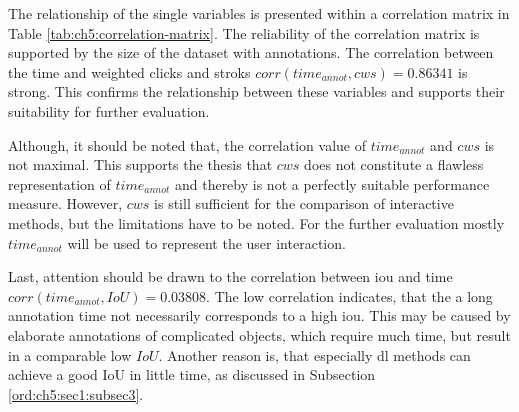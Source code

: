The relationship of the single variables is presented within a correlation matrix in Table \ref{tab:ch5:correlation-matrix}.
The reliability of the correlation matrix is supported by the size of the dataset with \getNumberBenchmarkAnnotations \space annotations.
The correlation between the time and weighted clicks and stroks $ corr \left(time_{annot}, cws \right) = 0.86341 $ is strong.
This confirms the relationship between these variables and supports their suitability for further evaluation.

Although, it should be noted that, the correlation value of $time_{annot}$ and $cws$ is not maximal.
This supports the thesis that $cws$ does not constitute a flawless representation of $time_{annot}$ and thereby is not a perfectly suitable performance measure.
However, $cws$ is still sufficient for the comparison of interactive methods, but the limitations have to be noted.
For the further evaluation mostly $time_{annot}$ will be used to represent the user interaction.

Last, attention should be drawn to the correlation between \gls{iou} and time $ corr \left(time_{annot}, IoU \right) = 0.03808 $.
The low correlation indicates, that the a long annotation time not necessarily corresponds to a high \gls{iou}.
This may be caused by elaborate annotations of complicated objects, which require much time, but result in a comparable low $ IoU $.
Another reason is, that especially \gls{dl} methods can achieve a good IoU in little time, as discussed in Subsection \ref{ord:ch5:sec1:subsec3}.


